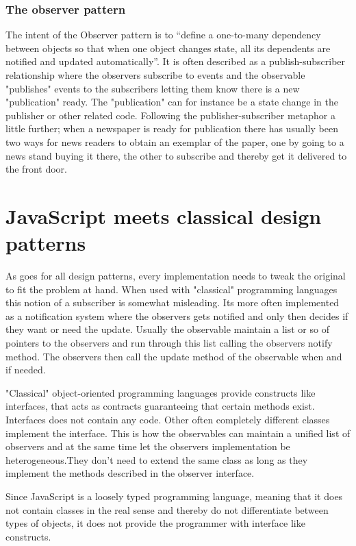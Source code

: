 \documentclass[english]{ifimaster}
\begin{document}
\subsubsection{The observer pattern}
The intent of the Observer pattern is to “define a one-to-many dependency between objects so that when one object changes state, all its dependents are notified and updated automatically”\parencite[p. 9]{gamma}. It is often described as a publish-subscriber relationship where the observers subscribe to events and the observable "publishes" events to the subscribers letting them know there is a new "publication" ready. The "publication" can for instance be a state change in the publisher or other related code. Following the publisher-subscriber metaphor a little further; when a newspaper is ready for publication there has usually been two ways for news readers to obtain an exemplar of the paper, one by going to a news stand buying it there, the other to subscribe and thereby get it delivered to the front door\parencite[p. 171-174]{stefanov}.

\section{JavaScript meets classical design patterns}
As goes for all design patterns, every implementation needs to tweak the original to fit the problem at hand. When used with "classical" programming languages this notion of a subscriber is somewhat misleading. Its more often implemented as a notification system where the observers gets notified and only then decides if they want or need the update. Usually the observable maintain a list or so of pointers to the observers and run through this list calling the observers notify method. The observers then call the update method of the observable when and if needed.

"Classical" object-oriented programming languages provide constructs like interfaces, that acts as contracts guaranteeing that certain methods exist. Interfaces does not contain any code. Other often completely different classes implement the interface. This is how the observables can maintain a unified list of observers and at the same time let the observers implementation be heterogeneous.They don't need to extend the same class as long as they implement the methods described in the observer interface. 

Since JavaScript is a loosely typed programming language, meaning that it does not contain classes in the real sense and thereby do not differentiate between types of objects, it does not provide the programmer with interface like constructs.  
\end{document}
